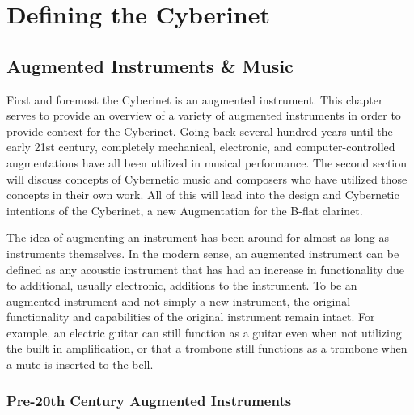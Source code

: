 \mainmatter






\chapter{Defining the Cyberinet}

\section{Augmented Instruments \& Music}

First and foremost the Cyberinet is an augmented instrument. This chapter serves to provide an overview of a variety of augmented instruments in order to provide context for the Cyberinet. Going back several hundred years until the early 21st century, completely mechanical, electronic, and computer-controlled augmentations have all been utilized in musical performance. The second section will discuss concepts of Cybernetic music and composers who have utilized those concepts in their own work. All of this will lead into the design and Cybernetic intentions of the Cyberinet, a new Augmentation for the B-flat clarinet.

The idea of augmenting an instrument has been around for almost as long as instruments themselves. In the modern sense, an augmented instrument can be defined as any acoustic instrument that has had an increase in functionality due to additional, usually electronic, additions to the instrument. To be an augmented instrument and not simply a new instrument, the original functionality and capabilities of the original instrument remain intact\cite{miranda_Wanderley_instrumentControl_2006}. For example, an electric guitar can still function as a guitar even when not utilizing the built in amplification, or that a trombone still functions as a trombone when a mute is inserted to the bell.



\subsection{Pre-20th Century Augmented Instruments}

